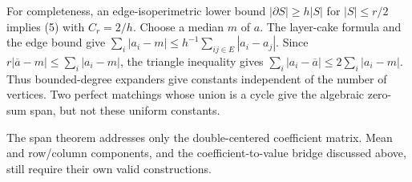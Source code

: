 \documentclass[11pt]{article}
\begin{document}
For completeness, an edge-isoperimetric lower bound
$|\partial S|\ge h|S|$ for $|S|\le r/2$ implies (5) with
$C_r=2/h$. Choose a median $m$ of $a$. The layer-cake formula and
the edge bound give
$\sum_i|a_i-m|\le h^{-1}\sum_{ij\in E}|a_i-a_j|$.
Since
$r|\overline a-m|\le\sum_i|a_i-m|$, the triangle inequality gives
$\sum_i|a_i-\overline a|\le2\sum_i|a_i-m|$.
Thus bounded-degree expanders give constants independent of the number
of vertices. Two perfect matchings whose union is a cycle give the
algebraic zero-sum span, but not these uniform constants.

The span theorem addresses only the double-centered coefficient
matrix. Mean and row/column components, and the coefficient-to-value
bridge discussed above, still require their own valid constructions.
\end{document}

